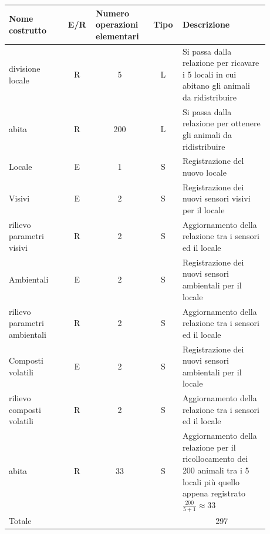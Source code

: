 \documentclass[12pt,a4paper]{article}
\begin{document}
\begin{center}\setlength{\extrarowheight}{1.5pt}\begin{longtable}{|p{0.2\linewidth}|p{0.1\linewidth}|p{0.175\linewidth}|p{0.1\linewidth}|p{0.3\linewidth}|}\hline \textbf{Nome costrutto}   & \multicolumn{1}{|c|}{\textbf{E/R}} & \textbf{Numero operazioni elementari} & \multicolumn{1}{|c|}{\textbf{Tipo}} & \textbf{Descrizione}\\ 
\hline
divisione locale
 & 
\multicolumn{1}{|c|}{R}
 & 
\multicolumn{1}{|c|}{5}
 & 
\multicolumn{1}{|c|}{L}
 & 
Si passa dalla relazione per ricavare i 5 locali in cui abitano gli animali da ridistribuire
\\
\hline
abita
 & 
\multicolumn{1}{|c|}{R}
 & 
\multicolumn{1}{|c|}{200}
 & 
\multicolumn{1}{|c|}{L}
 & 
Si passa dalla relazione per ottenere gli animali da ridistribuire
\\
\hline
Locale
 & 
\multicolumn{1}{|c|}{E}
 & 
\multicolumn{1}{|c|}{1}
 & 
\multicolumn{1}{|c|}{S}
 & 
Registrazione del nuovo locale
\\
\hline
Visivi
 & 
\multicolumn{1}{|c|}{E}
 & 
\multicolumn{1}{|c|}{2}
 & 
\multicolumn{1}{|c|}{S}
 & 
Registrazione dei nuovi sensori visivi per il locale
\\
\hline
rilievo parametri visivi
 & 
\multicolumn{1}{|c|}{R}
 & 
\multicolumn{1}{|c|}{2}
 & 
\multicolumn{1}{|c|}{S}
 & 
Aggiornamento della relazione tra i sensori ed il locale
\\
\hline
Ambientali
 & 
\multicolumn{1}{|c|}{E}
 & 
\multicolumn{1}{|c|}{2}
 & 
\multicolumn{1}{|c|}{S}
 & 
Registrazione dei nuovi sensori ambientali per il locale
\\
\hline
rilievo parametri ambientali
 & 
\multicolumn{1}{|c|}{R}
 & 
\multicolumn{1}{|c|}{2}
 & 
\multicolumn{1}{|c|}{S}
 & 
Aggiornamento della relazione tra i sensori ed il locale
\\
\hline
Composti volatili
 & 
\multicolumn{1}{|c|}{E}
 & 
\multicolumn{1}{|c|}{2}
 & 
\multicolumn{1}{|c|}{S}
 & 
Registrazione dei nuovi sensori ambientali per il locale
\\
\hline
rilievo composti volatili
 & 
\multicolumn{1}{|c|}{R}
 & 
\multicolumn{1}{|c|}{2}
 & 
\multicolumn{1}{|c|}{S}
 & 
Aggiornamento della relazione tra i sensori ed il locale
\\
\hline
abita
 & 
\multicolumn{1}{|c|}{R}
 & 
\multicolumn{1}{|c|}{33}
 & 
\multicolumn{1}{|c|}{S}
 & 
Aggiornamento della relazione per il ricollocamento dei 200 animali tra i 5 locali più quello appena registrato $\frac{200}{5+1}\approx 33$
\\
\hline
\multicolumn{4}{|l|}{Totale}
 & 
\multicolumn{1}{|c|}{297}
\\
\hline
\end{longtable}\end{center}
\end{document}
